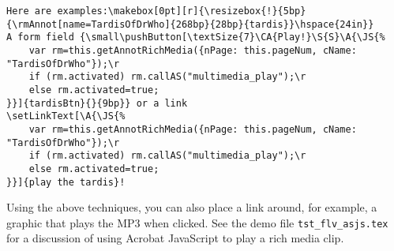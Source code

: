 \documentclass{article}
\begin{document}
\begingroup\footnotesize
\begin{verbatim}
Here are examples:\makebox[0pt][r]{\resizebox{!}{5bp}
{\rmAnnot[name=TardisOfDrWho]{268bp}{28bp}{tardis}}\hspace{24in}}
A form field {\small\pushButton[\textSize{7}\CA{Play!}\S{S}\A{\JS{%
    var rm=this.getAnnotRichMedia({nPage: this.pageNum, cName: "TardisOfDrWho"});\r
    if (rm.activated) rm.callAS("multimedia_play");\r
    else rm.activated=true;
}}]{tardisBtn}{}{9bp}} or a link
\setLinkText[\A{\JS{%
    var rm=this.getAnnotRichMedia({nPage: this.pageNum, cName: "TardisOfDrWho"});\r
    if (rm.activated) rm.callAS("multimedia_play");\r
    else rm.activated=true;
}}]{play the tardis}!
\end{verbatim}
\endgroup

Using the above techniques, you can also place a link around, for example, a graphic that
plays the MP3 when clicked. See the demo file \texttt{tst\_flv\_asjs.tex} for a discussion
of using Acrobat JavaScript to play a rich media clip.
\end{document}

